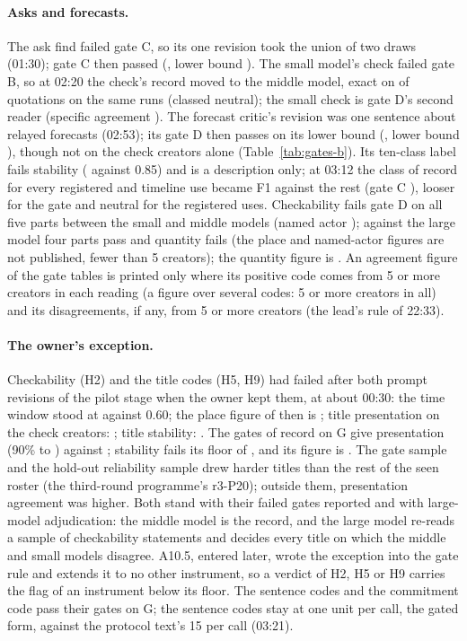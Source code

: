 \paragraph{Asks and forecasts.} The ask find failed gate C, so its one revision took the union of two draws (01:30);
gate C then passed (\AsksGateC, lower bound \AsksGateCLower). The small model's check failed gate B, so at 02:20 the
check's record moved to the middle model, exact on \AsksMiddleExact{} of \AsksMiddleExact{} quotations on the same runs
(classed neutral); the small check is gate D's second reader (specific agreement \AsksGateD). The forecast critic's
revision was one sentence about relayed forecasts (02:53); its gate D then passes on its lower bound (\FbGateD, lower
bound \FbGateDLower), though not on the check creators alone (Table~\ref{tab:gates-b}). Its ten-class label fails
stability (\FbTenClassStab{} against 0.85) and is a description only; at 03:12 the class of record for every registered
and timeline use became F1 against the rest (gate C \FbGateC), looser for the gate and neutral for the registered uses.
Checkability fails gate D on all five parts between the small and middle models (named actor \FcNamedActorSmallMid);
against the large model four parts pass and quantity fails (the place and named-actor figures are not published, fewer
than 5 creators); the quantity figure is \FcQuantityLarge. An agreement figure of the gate tables is printed only where
its positive code comes from 5 or more creators in each reading (a figure over several codes: 5 or more creators in
all) and its disagreements, if any, from 5 or more creators (the lead's rule of 22:33).

\paragraph{The owner's exception.} Checkability (H2) and the title codes (H5, H9) had failed after both prompt
revisions of the pilot stage when the owner kept them, at about 00:30: the time window stood at \ChkTimeKappaEarly{}
against 0.60; the place figure of then is \ChkPlaceKappaEarly; title presentation on the check creators:
\TitlePresKappa; title stability: \TitleStab. The gates of record on G give presentation \TitlePresKappaG{} (90\%
\TitlePresKappaGLo{} to \TitlePresKappaGHi) against \TitlePresFloor; stability fails its floor of \TitleStabGFloor,
and its figure is \TitleStabG. The gate sample and the hold-out reliability sample drew harder titles than the rest
of the seen roster (the third-round programme's r3-P20); outside them, presentation agreement was higher. Both stand with their failed gates reported and with large-model adjudication: the middle model is the
record, and the large model re-reads a sample of checkability statements and decides every title on which the middle
and small models disagree. A10.5, entered later, wrote the exception into the gate rule and extends it to no other
instrument, so a verdict of H2, H5 or H9 carries the flag of an instrument below its floor. The sentence codes and the
commitment code pass their gates on G; the sentence codes stay at one unit per call, the gated form, against the
protocol text's 15 per call (03:21).

